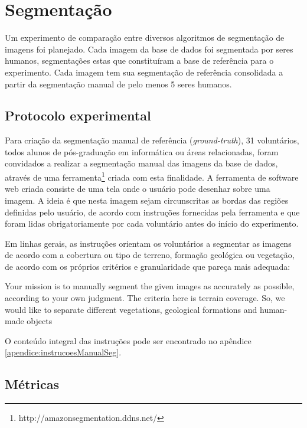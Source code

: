 \section{Segmentação}

Um experimento de comparação entre diversos algoritmos de segmentação de imagens foi planejado. Cada imagem da base de dados foi segmentada por seres humanos, segmentações estas que constituíram a base de referência para o experimento. Cada imagem tem sua segmentação de referência consolidada a partir da segmentação manual de pelo menos 5 seres humanos.

\subsection{Protocolo experimental}

Para criação da segmentação manual de referência (\textit{ground-truth}), 31 voluntários, todos alunos de pós-graduação em informática ou áreas relacionadas, foram convidados a realizar a segmentação manual das imagens da base de dados, através de uma ferramenta\footnote{http://amazonsegmentation.ddns.net/} criada com esta finalidade. A ferramenta de software web criada consiste de uma tela onde o usuário pode desenhar sobre uma imagem. A ideia é que nesta imagem sejam circunscritas as bordas das regiões definidas pelo usuário, de acordo com instruções fornecidas pela ferramenta e que foram lidas obrigatoriamente por cada voluntário antes do início do experimento.

Em linhas gerais, as instruções orientam os voluntários a segmentar as imagens de acordo com a cobertura ou tipo de terreno, formação geológica ou vegetação, de acordo com os próprios critérios e granularidade que pareça mais adequada:

\begin{citacao}[english]
Your mission is to manually segment the given images as accurately as possible, according to your own judgment. The criteria here is terrain coverage. So, we would like to separate different vegetations, geological formations and human-made objects \cite{amazonsegmentation}
\end{citacao}

O conteúdo integral das instruções pode ser encontrado no apêndice \ref{apendice:instrucoesManualSeg}.


\subsection{Métricas}

